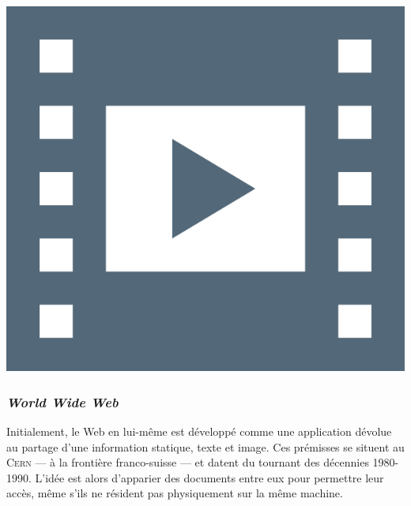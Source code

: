 \begin{marginvideo}
	[\label{vid:II.1}Web sociétal I.]%
	\href{https://www.youtube.com/watch?v=Tt7dat0QbbE&list=PLWvGMqXvyJAMNWRvODUB5Ry3licACdaa0&index=11}%
		{\includegraphics[width=\marginparwidth]{./Images/Pictograms/film-strip-dark-electric-blue.png}}%
\end{marginvideo}


\subsubsection[\textit{World Wide Web}]{\textit{World Wide Web}}
\label{subsub:II.1.1.1}

Initialement, le Web en lui-même est développé comme une application dévolue au partage d'une information statique, texte et image. Ces prémisses se situent au \textsc{Cern} --- à la frontière franco-suisse --- et datent du tournant des décennies 1980-1990. L'idée est alors d'apparier des documents entre eux pour permettre leur accès, même s'ils ne résident pas physiquement sur la même machine. 

